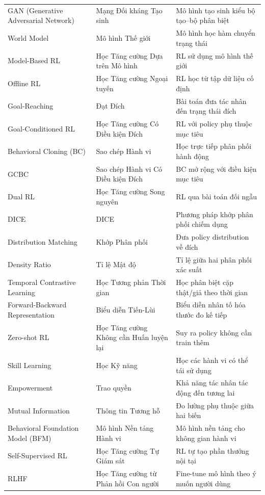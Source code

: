 \documentclass[12pt,a4paper]{article}
\begin{document}
\begin{center}
\begin{longtable}{p{5cm} p{4.5cm} p{4.5cm}}
    GAN (Generative Adversarial Network) & Mạng Đối kháng Tạo sinh & Mô hình tạo sinh kiểu bộ tạo--bộ phân biệt \\
    World Model & Mô hình Thế giới & Mô hình học hàm chuyển trạng thái \\
    Model-Based RL & Học Tăng cường Dựa trên Mô hình & RL sử dụng mô hình thế giới \\
    Offline RL & Học Tăng cường Ngoại tuyến & RL học từ tập dữ liệu cố định \\
    Goal-Reaching & Đạt Đích & Bài toán đưa tác nhân đến trạng thái đích \\
    Goal-Conditioned RL & Học Tăng cường Có Điều kiện Đích & RL với policy phụ thuộc mục tiêu \\
    Behavioral Cloning (BC) & Sao chép Hành vi & Học trực tiếp phân phối hành động \\
    GCBC & Sao chép Hành vi Có Điều kiện Đích & BC mở rộng với điều kiện mục tiêu \\
    Dual RL & Học Tăng cường Song nguyên & RL qua bài toán đối ngẫu \\
    DICE & DICE & Phương pháp khớp phân phối chiếm dụng \\
    Distribution Matching & Khớp Phân phối & Đưa policy distribution về đích \\
    Density Ratio & Tỉ lệ Mật độ & Tỉ lệ giữa hai phân phối xác suất \\
    Temporal Contrastive Learning & Học Tương phản Thời gian & Học phân biệt cặp thật/giả theo thời gian \\
    Forward-Backward Representation & Biểu diễn Tiến-Lùi & Biểu diễn nhân tố hóa thước đo kế tiếp \\
    Zero-shot RL & Học Tăng cường Không cần Huấn luyện lại & Suy ra policy không cần train thêm \\
    Skill Learning & Học Kỹ năng & Học các hành vi có thể tái sử dụng \\
    Empowerment & Trao quyền & Khả năng tác nhân tác động đến tương lai \\
    Mutual Information & Thông tin Tương hỗ & Đo lường phụ thuộc giữa hai biến \\
    Behavioral Foundation Model (BFM) & Mô hình Nền tảng Hành vi & Mô hình nền tảng cho không gian hành vi \\
    Self-Supervised RL & Học Tăng cường Tự Giám sát & RL tự tạo phần thưởng nội tại \\
    RLHF & Học Tăng cường từ Phản hồi Con người & Fine-tune mô hình theo ý muốn người dùng \\

\end{longtable}
\end{center}
\end{document}

